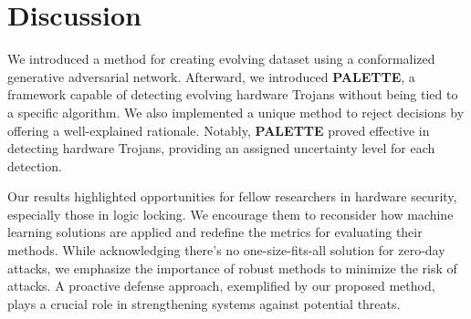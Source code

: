 \section*{Discussion}


We introduced a method for creating evolving dataset using a conformalized generative adversarial network. Afterward, we introduced \textbf{PALETTE}, a framework capable of detecting evolving hardware Trojans without being tied to a specific algorithm. We also implemented a unique method to reject decisions by offering a well-explained rationale. Notably, \textbf{PALETTE} proved effective in detecting hardware Trojans, providing an assigned uncertainty level for each detection.

Our results highlighted opportunities for fellow researchers in hardware security, especially those in logic locking. We encourage them to reconsider how machine learning solutions are applied and redefine the metrics for evaluating their methods. While acknowledging there's no one-size-fits-all solution for zero-day attacks, we emphasize the importance of robust methods to minimize the risk of attacks. A proactive defense approach, exemplified by our proposed method, plays a crucial role in strengthening systems against potential threats.

\endgroup